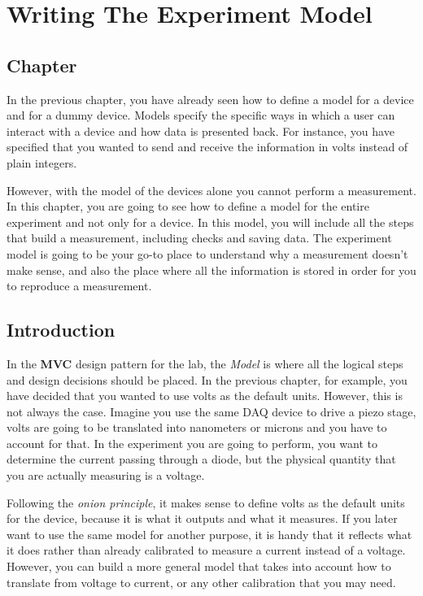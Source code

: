 \chapter{Writing The Experiment Model}\label{writing-our-experimentmodel}

\section{Chapter}
In the previous chapter, you have already seen how to define a model for
a device and for a dummy device. Models specify the specific ways in
which a user can interact with a device and how data is presented back.
For instance, you have specified that you wanted to send and receive the
information in volts instead of plain integers.

However, with the model of the devices alone you cannot perform a
measurement. In this chapter, you are going to see how to define a model
for the entire experiment and not only for a device. In this model, you
will include all the steps that build a measurement, including checks
and saving data. The experiment model is going to be your go-to place to
understand why a measurement doesn't make sense, and also the place
where all the information is stored in order for you to reproduce
a measurement.

\section{Introduction}
In the \textbf{MVC} design pattern for the lab, the \emph{Model} is
where all the logical steps and design decisions should be placed. In
the previous chapter, for example, you have decided that you wanted to
use volts as the default units. However, this is not always the case.
Imagine you use the same {DAQ} device to drive a piezo stage, volts are
going to be translated into nanometers or microns and you have to
account for that. In the experiment you are going to perform, you want
to determine the current passing through a diode, but the physical quantity that you are actually measuring is a voltage.

Following the \emph{onion principle}, it makes sense to define volts as
the default units for the device, because it is what it outputs and what
it measures. If you later want to use the same model for another
purpose, it is handy that it reflects what it does rather than already
calibrated to measure a current instead of a voltage. However, you can
build a more general model that takes into account how to translate from
voltage to current, or any other calibration that you may need.

